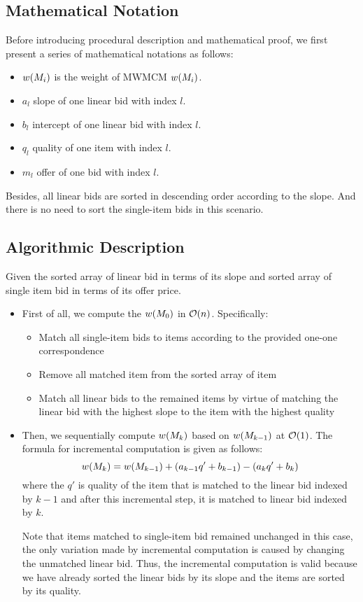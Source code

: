 \documentclass[11pt,a4paper]{article}
\begin{document}
\subsection{Mathematical Notation}
Before introducing procedural description and mathematical proof, we first
present a series of mathematical notations as follows: 
\begin{itemize}
    \item{$w(M_i)$ is the weight of MWMCM $w(M_i)$.}
    \item{$a_l$ slope of one linear bid with index $l$.}
    \item{$b_l$ intercept of one linear bid with index $l$.}
    \item{$q_l$ quality of one item with index $l$.}
    \item{$m_l$ offer of one bid with index $l$.}
\end{itemize}

Besides, all linear bids are sorted in descending order according to the
slope. And there is no need to sort the single-item bids in this scenario. 

\subsection{Algorithmic Description}
Given the sorted array of linear bid in terms of its slope and sorted array of
single item bid in terms of its offer price. 

\begin{itemize}
    \item{First of all, we compute the $w(M_{0})$ in $\mathcal{O}(n)$.
        Specifically: }
        \begin{itemize}
        \item{Match all single-item bids to items according to the provided
            one-one correspondence}
        \item{Remove all matched item from the sorted array of item}
        \item{Match all linear bids to the remained items by virtue of
                matching the linear bid with the highest slope to the item
            with the highest quality}
        \end{itemize}

    \item{Then, we sequentially compute $w(M_{k})$ based on $w(M_{k-1})$ at
        $\mathcal{O}(1)$. The formula for incremental computation is given as
    follows: }
    $$
    w(M_{k}) = w(M_{k-1}) + (a_{k-1} q' + b_{k-1}) 
        - (a_k q' + b_k)
    $$
    where the $q'$ is quality of the item that is matched to the linear bid
    indexed by $k-1$ and after this incremental step, it is matched to linear
    bid indexed by $k$. 
    
    Note that items matched to single-item bid remained unchanged in this
    case, the only variation made by incremental computation is caused by
    changing the unmatched linear bid. Thus, the incremental computation is
    valid because we have already sorted the linear bids by its slope and the
    items are sorted by its quality. 

\end{itemize}
 
\end{document}
